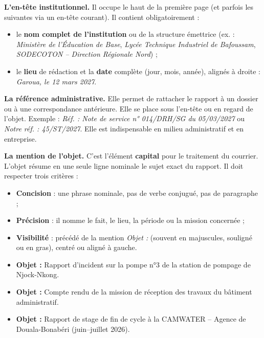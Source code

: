 \documentclass[11pt]{article}
\newcommand{\cle}[1]{{\popxbold\color{popdark}#1}}
\begin{document}
\textbf{L'en-tête institutionnel.} Il occupe le haut de la première page (et parfois les suivantes via un en-tête courant). Il contient obligatoirement :
\begin{itemize}
\item le \textbf{nom complet de l'institution} ou de la structure émettrice (ex. : \emph{Ministère de l'Éducation de Base}, \emph{Lycée Technique Industriel de Bafoussam}, \emph{SODECOTON -- Direction Régionale Nord}) ;
\item le \textbf{lieu} de rédaction et la \textbf{date} complète (jour, mois, année), alignés à droite : \emph{Garoua, le 12 mars 2027}.
\end{itemize}

\textbf{La référence administrative.} Elle permet de rattacher le rapport à un dossier ou à une correspondance antérieure. Elle se place sous l'en-tête ou en regard de l'objet. Exemple : \emph{Réf. : Note de service n° 014/DRH/SG du 05/03/2027} ou \emph{Notre réf. : 45/ST/2027}. Elle est indispensable en milieu administratif et en entreprise.

\textbf{La mention de l'objet.} C'est l'élément \textbf{capital} pour le traitement du courrier. L'\cle{objet} résume en une seule ligne nominale le sujet exact du rapport. Il doit respecter trois critères :
\begin{itemize}
\item \textbf{Concision} : une phrase nominale, pas de verbe conjugué, pas de paragraphe ;
\item \textbf{Précision} : il nomme le fait, le lieu, la période ou la mission concernée ;
\item \textbf{Visibilité} : précédé de la mention \emph{Objet :} (souvent en majuscules, souligné ou en gras), centré ou aligné à gauche.
\end{itemize}

\begin{exemplebox}
\begin{itemize}
\item \textbf{Objet :} Rapport d'incident sur la pompe n°3 de la station de pompage de Njock-Nkong.
\item \textbf{Objet :} Compte rendu de la mission de réception des travaux du bâtiment administratif.
\item \textbf{Objet :} Rapport de stage de fin de cycle à la CAMWATER -- Agence de Douala-Bonabéri (juin--juillet 2026).
\end{itemize}
\end{exemplebox}
\end{document}
